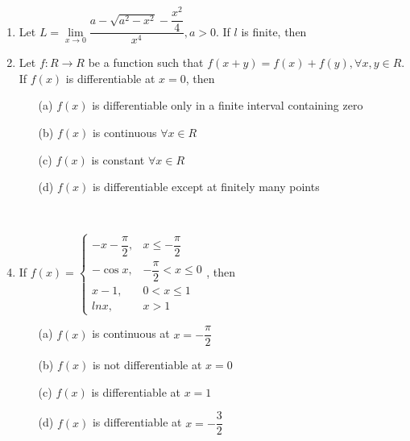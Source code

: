 \documentclass[journal,12pt,twocolumn]{IEEEtran}
\begin{document}
\begin{enumerate}
\item Let $L=\lim\limits_{x \to 0}\dfrac{a-\sqrt{a^2-x^2}-\dfrac{x^2}{4}}{x^4}, a>0$. If $l$ is finite, then
\begin{itemize}
\end{itemize}

\item Let $f:R\to R$ be a function such that $f(x+y)=f(x)+f(y), \forall x, y\in R$. If $f(x)$ is differentiable at $x=0$, then
\begin{itemize}
\item[(a)] $f(x)$ is differentiable only in a finite interval containing zero
\item[(b)] $f(x)$ is continuous $\forall x \in R$
\item[(c)] $f(x)$ is constant $\forall x \in R$
\item[(d)] $f(x)$ is differentiable except at finitely many points 
\end{itemize} 

\item[~]\item If $f(x)=\begin{cases}
-x-\dfrac{\pi}{2}, & \text{$x\leq -\dfrac{\pi}{2}$}\\
-\cos x, & \text{$-\dfrac{\pi}{2}<x\leq 0$}\\
x-1, & \text{$0<x\leq 1$}\\
lnx, & \text{$x>1$}
\end{cases}$, then
\begin{itemize}
\item[(a)] $f(x)$ is continuous at $x=-\dfrac{\pi}{2}$
\item[(b)] $f(x)$ is not differentiable at $x=0$
\item[(c)] $f(x)$ is differentiable at $x=1$
\item[(d)] $f(x)$ is differentiable at $x=-\dfrac{3}{2}$
\end{itemize}


\end{enumerate}
\end{document}
